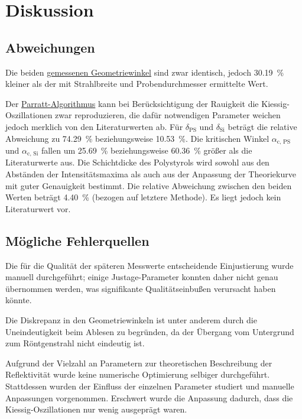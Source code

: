 \section{Diskussion}
\label{sec:diskussion}

\subsection{Abweichungen}
Die beiden \hyperref[sec:auswertung:rockingscan]{gemessenen Geometriewinkel} sind zwar identisch,
jedoch \SI{30.19}{\percent} kleiner als der mit Strahlbreite und Probendurchmesser ermittelte Wert.

Der \hyperref[sec:auswertung:schichtdicke]{Parratt-Algorithmus} kann bei Berücksichtigung der Rauigkeit
die Kiessig-Oszillationen zwar reproduzieren,
die dafür notwendigen Parameter weichen jedoch merklich von den Literaturwerten ab.
Für $\delta_\text{PS}$ und $\delta_\text{Si}$ beträgt die relative Abweichung zu \cite{versuchsanleitung}
\SI{74.29}{\percent} beziehungsweise \SI{10.53}{\percent}.
Die kritischen Winkel $\alpha_\text{c, PS}$ und $\alpha_\text{c, Si}$
fallen um \SI{25.69}{\percent} beziehungsweise \SI{60.36}{\percent} größer als die Literaturwerte \cite{versuchsanleitung} aus.
Die Schichtdicke des Polystyrols wird
    sowohl aus den Abständen der Intensitätsmaxima
    als auch aus der Anpassung der Theoriekurve
mit guter Genauigkeit bestimmt.
Die relative Abweichung zwischen den beiden Werten beträgt \SI{4.40}{\percent}
    (bezogen auf letztere Methode).
Es liegt jedoch kein Literaturwert vor.


\subsection{Mögliche Fehlerquellen}
Die für die Qualität der späteren Messwerte entscheidende Einjustierung
wurde manuell durchgeführt;
einige Justage-Parameter konnten daher nicht genau übernommen werden,
was signifikante Qualitätseinbußen verursacht haben könnte.

Die Diskrepanz in den Geometriewinkeln ist unter anderem durch die Uneindeutigkeit beim Ablesen zu begründen,
da der Übergang vom Untergrund zum Röntgenstrahl nicht eindeutig ist.

Aufgrund der Vielzahl an Parametern zur theoretischen Beschreibung der Reflektivität
wurde keine numerische Optimierung selbiger durchgeführt.
Stattdessen wurden der Einfluss der einzelnen Parameter studiert
und manuelle Anpassungen vorgenommen.
Erschwert wurde die Anpassung dadurch,
dass die Kiessig-Oszillationen nur wenig ausgeprägt waren.

